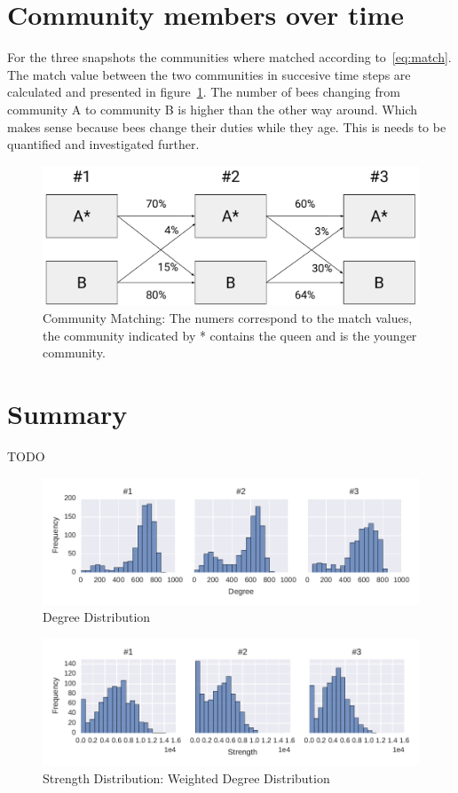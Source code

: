 \section{Community members over time}
For the three snapshots the communities where matched according to~\ref{eq:match}. The match value between the two communities in succesive time steps are calculated and presented in figure~\ref{fig:members}. The number of bees changing from community A to community B is higher than the other way around. Which makes sense because bees change their duties while they age. This is needs to be quantified and investigated further.

\begin{figure}[htb]
	\centering
	\includegraphics[width=.8\textwidth]{Figures/members}
	\caption[Community Matching]{Community Matching: The numers correspond to the match values, the community indicated by * contains the queen and is the younger community.}
	\label{fig:members}
\end{figure}


\section{Summary}
TODO




\begin{figure}[htb]
	\centering
	\includegraphics[width=1.0\textwidth]{Figures/stat-degreeDist}
	\caption[Degree Distribution]{Degree Distribution}
	\label{fig:statDegreeDist}
\end{figure}


\begin{figure}[htb]
	\centering
	\includegraphics[width=1.0\textwidth]{Figures/stat-strengthDist}
	\caption[Strength Distribution]{Strength Distribution: Weighted Degree Distribution}
	\label{fig:statStrengthDist}
\end{figure}

